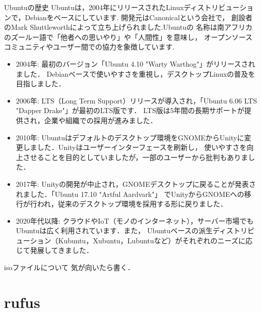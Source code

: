 \documentclass[dvipdfmx,a4paper,11pt]{jsbook}
\begin{document}
\begin{subbox}{Ubuntuの歴史}
  Ubuntuは，2004年にリリースされたLinuxディストリビューションで，Debianをベースにしています.
  開発元はCanonicalという会社で，
  創設者のMark Shuttleworthによって立ち上げられました.Ubuntuの
  名称は南アフリカのズールー語で「他者への思いやり」や「人間性」を意味し，
  オープンソースコミュニティやユーザー間での協力を象徴しています.
  \begin{itemize}
    \item 2004年: 最初のバージョン「Ubuntu 4.10 "Warty Warthog"」がリリースされました．
    Debianベースで使いやすさを重視し，デスクトップLinuxの普及を目指しました．
    \item 2006年: LTS（Long Term Support）リリースが導入され，「Ubuntu 6.06 LTS "Dapper Drake"」が最初のLTS版です．
    LTS版は5年間の長期サポートが提供され，企業や組織での採用が進みました．
    \item 2010年: Ubuntuはデフォルトのデスクトップ環境をGNOMEからUnityに変更しました．Unityはユーザーインターフェースを刷新し，
    使いやすさを向上させることを目的としていましたが，一部のユーザーから批判もありました．
    \item 2017年: Unityの開発が中止され，GNOMEデスクトップに戻ることが発表されました．「Ubuntu 17.10 "Artful Aardvark"」
    でUnityからGNOMEへの移行が行われ，従来のデスクトップ環境を採用する形に戻りました．
    \item 2020年代以降: クラウドやIoT（モノのインターネット），サーバー市場でもUbuntuは広く利用されています．また，
    Ubuntuベースの派生ディストリビューション（Kubuntu，Xubuntu，Lubuntuなど）がそれぞれのニーズに応じて発展してきました．
  \end{itemize}
\end{subbox}

\begin{mainbox}{isoファイルについて}
  気が向いたら書く．
\end{mainbox}


\section{rufus}
\end{document}
